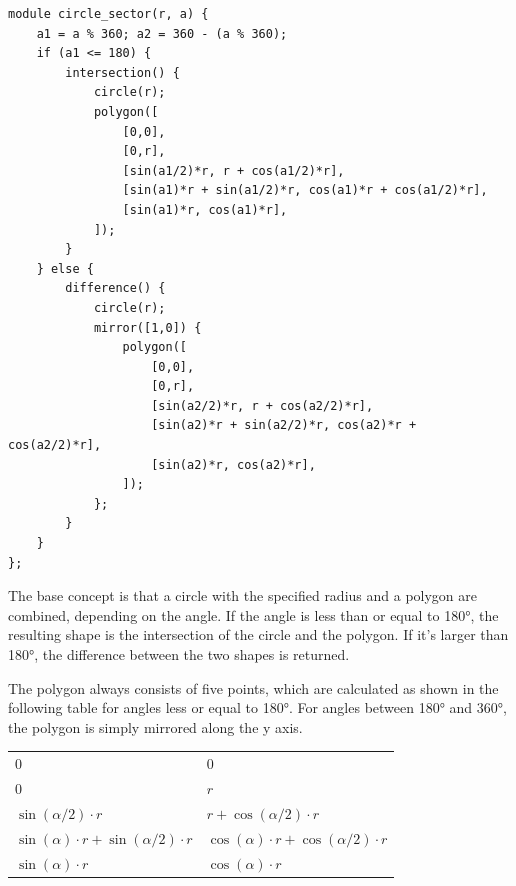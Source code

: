 \vspace{.5\baselineskip}
\begin{verbatim}
module circle_sector(r, a) {
    a1 = a % 360; a2 = 360 - (a % 360);
    if (a1 <= 180) {
        intersection() {
            circle(r);
            polygon([
                [0,0],
                [0,r],
                [sin(a1/2)*r, r + cos(a1/2)*r],
                [sin(a1)*r + sin(a1/2)*r, cos(a1)*r + cos(a1/2)*r],
                [sin(a1)*r, cos(a1)*r],
            ]);
        }
    } else {
        difference() {
            circle(r);
            mirror([1,0]) {
                polygon([
                    [0,0],
                    [0,r],
                    [sin(a2/2)*r, r + cos(a2/2)*r],
                    [sin(a2)*r + sin(a2/2)*r, cos(a2)*r + cos(a2/2)*r],
                    [sin(a2)*r, cos(a2)*r],
                ]);
            };
        }
    }
};
\end{verbatim}

\noindent The base concept is that a circle with the specified radius and a
polygon are combined, depending on the angle. If the angle is less than or equal
to 180\si{\degree}, the resulting shape is the intersection of the circle and
the polygon. If it's larger than 180\si{\degree}, the difference between the two
shapes is returned.

The polygon always consists of five points, which are calculated as shown in the
following table for angles less or equal to 180\si{\degree}. For angles between
180\si{\degree} and 360\si{\degree}, the polygon is simply mirrored along the y
axis.

\begin{table}[H]
	\centering
	\begin{tabularx}{\textwidth}{XX} \toprule
		\tableheadline{x} & \tableheadline{y} \\
		\midrule
		$0$ & $0$ \\
		$0$ & $r$ \\
		$\sin(\alpha / 2) \cdot r$ & $r + \cos(\alpha / 2) \cdot r$ \\
		$\sin(\alpha) \cdot r + \sin(\alpha / 2) \cdot r$ & $\cos(\alpha) \cdot r + \cos(\alpha / 2) \cdot r$ \\
		$\sin(\alpha) \cdot r$ & $\cos(\alpha) \cdot r$ \\
		\bottomrule
	\end{tabularx}
\end{table}

